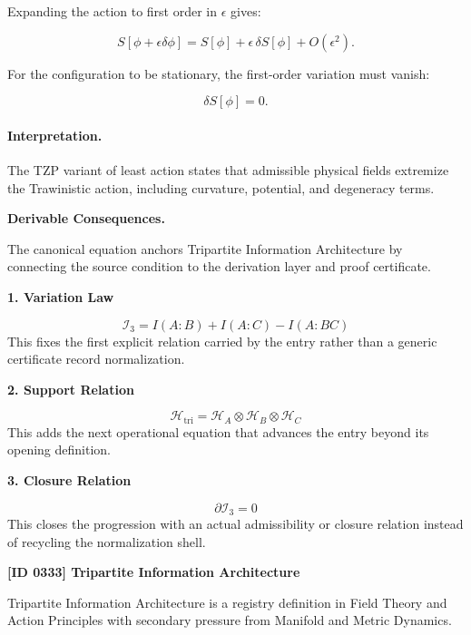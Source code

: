 Expanding the action to first order in $\epsilon$ gives:

\begin{equation}
S[\phi+\epsilon\delta\phi]
=
S[\phi]
+
\epsilon\,\delta S[\phi]
+
O(\epsilon^2).
\end{equation}

For the configuration to be stationary, the first-order variation must vanish:

\begin{equation}
\boxed{
\delta S[\phi]=0 .
}
\end{equation}

\paragraph{Interpretation.}
The TZP variant of least action states that admissible physical fields extremize the Trawinistic action, including curvature, potential, and degeneracy terms.

\par\vspace{0.35em}
\noindent\textbf{Derivable Consequences.}\quad
\begingroup
\footnotesize
\raggedright
The canonical equation anchors Tripartite Information Architecture by connecting the source condition to the derivation layer and proof certificate.
\par\endgroup

\noindent\textbf{1. Variation Law}\par
\[
\mathcal{I}_{3}=I(A:B)+I(A:C)-I(A:BC)
\]
\noindent This fixes the first explicit relation carried by the entry rather than a generic certificate record normalization.\par
\noindent\textbf{2. Support Relation}\par
\[
\mathcal{H}_{\mathrm{tri}}=\mathcal{H}_{A}\otimes\mathcal{H}_{B}\otimes\mathcal{H}_{C}
\]
\noindent This adds the next operational equation that advances the entry beyond its opening definition.\par
\noindent\textbf{3. Closure Relation}\par
\[
\partial\mathcal{I}_{3}=0
\]
\noindent This closes the progression with an actual admissibility or closure relation instead of recycling the normalization shell.\par

\clearpage
\noindent\textbf{[ID 0333] Tripartite Information Architecture}\par
\vspace{0.35em}
\begingroup\small
{}
Tripartite Information Architecture is a registry definition in Field Theory and Action Principles with secondary pressure from Manifold and Metric Dynamics.

